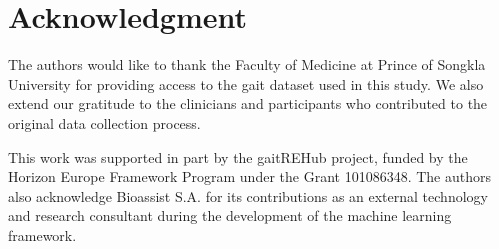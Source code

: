 \section{Acknowledgment}
\label{sec:acknowledgment}
The authors would like to thank the Faculty of Medicine at Prince of Songkla University for providing access to the gait dataset used in this study.
We also extend our gratitude to the clinicians and participants who contributed to the original data collection process.

This work was supported in part by the gaitREHub project, funded by the Horizon Europe Framework Program under the Grant 101086348.
The authors also acknowledge Bioassist S.A. for its contributions as an external technology and research consultant during the development 
of the machine learning framework.